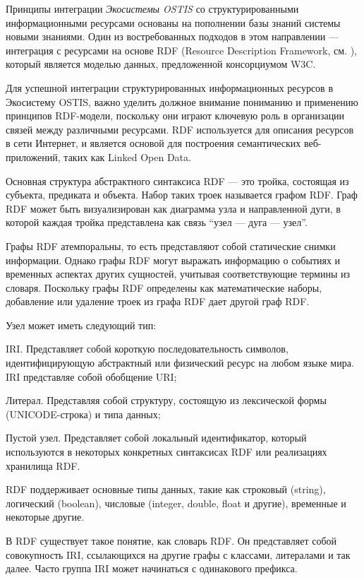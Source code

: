 Принципы интеграции \textit{Экосистемы OSTIS} со структурированными информационными ресурсами основаны на пополнении базы знаний системы новыми знаниями. Один из востребованных подходов в этом направлении --- интеграция с ресурсами на основе RDF (Resource Description Framework, см. ), который является моделью данных, предложенной консорциумом W3C.

Для успешной интеграции структурированных информационных ресурсов в Экосистему OSTIS, важно уделить должное внимание пониманию и применению принципов RDF-модели, поскольку они играют ключевую роль в организации связей между различными ресурсами. RDF используется для описания ресурсов в сети Интернет, и является основой для построения семантических веб-приложений, таких как Linked Open Data.

Основная структура абстрактного синтаксиса RDF --- это тройка, состоящая из субъекта, предиката и объекта. Набор таких троек называется графом RDF. Граф RDF может быть визуализирован как диаграмма узла и направленной дуги, в которой каждая тройка представлена как связь ``узел --- дуга --- узел''.

Графы RDF атемпоральны, то есть представляют собой статические снимки информации. Однако графы RDF могут выражать информацию о событиях и временных аспектах других сущностей, учитывая соответствующие термины из словаря. Поскольку графы RDF определены как математические наборы, добавление или удаление троек из графа RDF дает другой граф RDF.

Узел может иметь следующий тип:
\begin{textitemize}
    \item IRI. Представляет собой короткую последовательность символов, идентифицирующую абстрактный или физический ресурс на любом языке мира. IRI представляе собой обобщение URI;
    \item Литерал. Представляя собой структуру, состоящую из лексической формы (UNICODE-строка) и типа данных;
    \item Пустой узел. Представляет собой локальный идентификатор, который используются в некоторых конкретных синтаксисах RDF или реализациях хранилища RDF.
\end{textitemize}

RDF поддерживает основные типы данных, такие как строковый (string), логический (boolean), числовые (integer, double, float и другие), временные и некоторые другие.

В RDF существует такое понятие, как словарь RDF. Он представляет собой совокупность IRI, ссылающихся на другие графы с классами, литералами и так далее. Часто группа IRI может начинаться с одинакового префикса.

